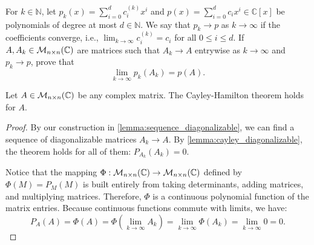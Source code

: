 \begin{exercise}
  \label{exc:convergence_of_matrix_polynomials}
  For $k \in \mathbb{N}$, let $p_k(x) = \sum_{i=0}^d c_i^{(k)} x^i$ and $p(x) = \sum_{i=0}^d c_i x^i \in \mathbb{C}[x]$ be polynomials of degree at most $d \in \mathbb{N}$. We say that $p_k \to p$ as $k \to \infty$ if the coefficients converge, i.e., $\lim_{k \to \infty} c_i^{(k)} = c_i$ for all $0 \le i \le d$.
  If $A, A_k \in \mathcal{M}_{n \times n}(\mathbb{C})$ are matrices such that $A_k \to A$ entrywise as $k \to \infty$ and $p_k \to p$, prove that
  \[
  \lim_{k \to \infty} p_k(A_k) = p(A).
  \]
\end{exercise}

\begin{lemma}
  \label{lemma:cayley_C}
  Let $A \in \mathcal{M}_{n \times n}(\mathbb{C})$ be any complex matrix. The Cayley-Hamilton theorem holds for $A$.
\end{lemma}

\begin{proof}
  By our construction in \cref{lemma:sequence_diagonalizable}, we can find a sequence of diagonalizable matrices $A_k \to A$. By \cref{lemma:cayley_diagonalizable}, the theorem holds for all of them: $P_{A_k}(A_k) = 0$.

  Notice that the mapping $\Phi: \mathcal{M}_{n \times n}(\mathbb{C}) \to \mathcal{M}_{n \times n}(\mathbb{C})$ defined by $\Phi(M) = P_M(M)$ is built entirely from taking determinants, adding matrices, and multiplying matrices. Therefore, $\Phi$ is a continuous polynomial function of the matrix entries. Because continuous functions commute with limits, we have:
  \[
  P_A(A) = \Phi(A) = \Phi\left(\lim_{k \to \infty} A_k\right) = \lim_{k \to \infty} \Phi(A_k) = \lim_{k \to \infty} 0 = 0.
  \]
\end{proof}

